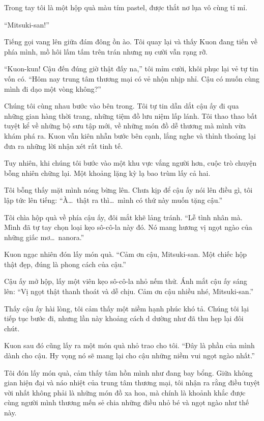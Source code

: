 \documentclass[../main.tex]{subfiles}
\begin{document}
Trong tay tôi là một hộp quà màu tím pastel, được thắt nơ lụa vô cùng tỉ mỉ.

``Mitsuki-san!''

Tiếng gọi vang lên giữa đám đông ồn ào. Tôi quay lại và thấy Kuon đang tiến về phía mình, mồ hôi lấm tấm trên trán nhưng nụ cười vẫn rạng rỡ.

``Kuon-kun! Cậu đến đúng giờ thật đấy na,'' tôi mỉm cười, khôi phục lại vẻ tự tin vốn có. ``Hôm nay trung tâm thương mại có vẻ nhộn nhịp nhỉ. Cậu có muốn cùng mình đi dạo một vòng không?''

Chúng tôi cùng nhau bước vào bên trong. Tôi tự tin dẫn dắt cậu ấy đi qua những gian hàng thời trang, những tiệm đồ lưu niệm lấp lánh. Tôi thao thao bất tuyệt kể về những bộ sưu tập mới, về những món đồ dễ thương mà mình vừa khám phá ra. Kuon vẫn kiên nhẫn bước bên cạnh, lắng nghe và thỉnh thoảng lại đưa ra những lời nhận xét rất tinh tế.

Tuy nhiên, khi chúng tôi bước vào một khu vực vắng người hơn, cuộc trò chuyện bỗng nhiên chững lại. Một khoảng lặng kỳ lạ bao trùm lấy cả hai.

Tôi bỗng thấy mặt mình nóng bừng lên. Chưa kịp để cậu ấy nói lên điều gì, tôi lập tức lên tiếng: ``À\dots\ thật ra thì\dots\ mình có thứ này muốn tặng cậu.''

Tôi chìa hộp quà về phía cậu ấy, đôi mắt khẽ lảng tránh. ``Lễ tình nhân mà. Mình đã tự tay chọn loại kẹo sô-cô-la này đó. Nó mang hương vị ngọt ngào của những giấc mơ\dots\ nanora.''

Kuon ngạc nhiên đón lấy món quà. ``Cảm ơn cậu, Mitsuki-san. Một chiếc hộp thật đẹp, đúng là phong cách của cậu.''

Cậu ấy mở hộp, lấy một viên kẹo sô-cô-la nhỏ nếm thử. Ánh mắt cậu ấy sáng lên: ``Vị ngọt thật thanh thoát và dễ chịu. Cảm ơn cậu nhiều nhé, Mitsuki-san.''

Thấy cậu ấy hài lòng, tôi cảm thấy một niềm hạnh phúc khó tả. Chúng tôi lại tiếp tục bước đi, nhưng lần này khoảng cách d dường như đã thu hẹp lại đôi chút.

Kuon sau đó cũng lấy ra một món quà nhỏ trao cho tôi. ``Đây là phần của mình dành cho cậu. Hy vọng nó sẽ mang lại cho cậu những niềm vui ngọt ngào nhất.''

Tôi đón lấy món quà, cảm thấy tâm hồn mình như đang bay bổng. Giữa không gian hiện đại và náo nhiệt của trung tâm thương mại, tôi nhận ra rằng điều tuyệt vời nhất không phải là những món đồ xa hoa, mà chính là khoảnh khắc được cùng người mình thương mến sẻ chia những điều nhỏ bé và ngọt ngào như thế này.
\end{document}
